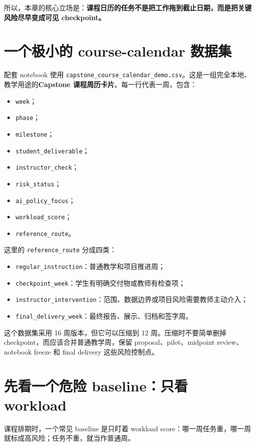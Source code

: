 所以，本章的核心立场是：\textbf{课程日历的任务不是把工作拖到截止日期，而是把关键风险尽早变成可见 checkpoint。}

\section{一个极小的 course-calendar 数据集}

配套 notebook 使用 \nolinkurl{capstone_course_calendar_demo.csv}。这是一组完全本地、教学用途的\textbf{Capstone 课程周历卡片}。每一行代表一周，包含：

\begin{itemize}
    \item \texttt{week}；
    \item \texttt{phase}；
    \item \texttt{milestone}；
    \item \texttt{student\_deliverable}；
    \item \texttt{instructor\_check}；
    \item \texttt{risk\_status}；
    \item \texttt{ai\_policy\_focus}；
    \item \texttt{workload\_score}；
    \item \texttt{reference\_route}。
\end{itemize}

这里的 \texttt{reference\_route} 分成四类：

\begin{itemize}
    \item \texttt{regular\_instruction}：普通教学和项目推进周；
    \item \texttt{checkpoint\_week}：学生有明确交付物或教师有检查项；
    \item \texttt{instructor\_intervention}：范围、数据边界或项目风险需要教师主动介入；
    \item \texttt{final\_delivery\_week}：最终报告、展示、归档和签字周。
\end{itemize}

这个数据集采用 16 周版本，但它可以压缩到 12 周。压缩时不要简单删掉 checkpoint，而应该合并普通教学周，保留 proposal、pilot、midpoint review、notebook freeze 和 final delivery 这些风险控制点。

\section{先看一个危险 baseline：只看 workload}

课程排期时，一个常见 baseline 是只盯着 workload score：哪一周任务重，哪一周就标成高风险；任务不重，就当作普通周。

